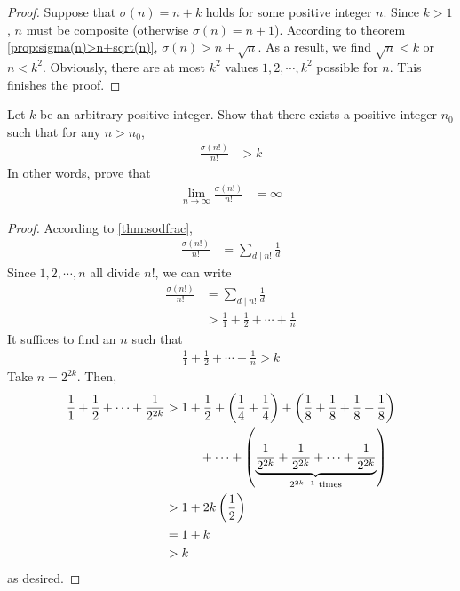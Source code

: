 \begin{proof}
	Suppose that $\sigma(n)=n+k$ holds for some positive integer $n$. Since $k>1$, $n$ must be composite (otherwise $\sigma(n)=n+1$). According to theorem \ref{prop:sigma(n)>n+sqrt(n)}, $\sigma(n) > n + \sqrt n$. As a result, we find $\sqrt n < k$ or $n < k^2$. Obviously, there are at most $k^2$ values $1,2,\cdots,k^2$ possible for $n$. This finishes the proof.
\end{proof}

\begin{theorem}
	Let $k$ be an arbitrary positive integer. Show that there exists a positive integer $n_0$ such that for any $n>n_0$,
		\begin{align*}
			\frac{\sigma(n!)}{n!}
				& > k
		\end{align*}
	In other words, prove that
		\begin{align*}
			\lim\limits_{n \to \infty} \frac{\sigma(n!)}{n!}
				& = \infty
		\end{align*}
\end{theorem}

\begin{proof}
	According to \autoref{thm:sodfrac},
		\begin{align*}
			\frac{\sigma(n!)}{n!} &= \sum_{d\mid n!} \frac{1}{d}
		\end{align*}
	Since $1,2,\cdots,n$ all divide $n!$, we can write
		\begin{align*}
			\frac{\sigma(n!)}{n!} &= \sum_{d\mid n!} \frac{1}{d}\\
						  &> \frac{1}{1} + \frac{1}{2}+ \cdots + \frac{1}{n}
		\end{align*}
	It suffices to find an $n$ such that
		\begin{align*}
			\frac{1}{1} + \frac{1}{2}+ \cdots + \frac{1}{n} > k
		\end{align*}
	Take $n=2^{2k}$. Then,
		\begin{align*}
			\frac{1}{1} + \frac{1}{2}+ \cdots + \frac{1}{2^{2k}}
				&> 1 + \frac{1}{2} + \left(\frac{1}{4} + \frac{1}{4}\right) +\left(\frac{1}{8} + \frac{1}{8}+\frac{1}{8} + \frac{1}{8}\right)\\
				&\phantom{>} \qquad  + \cdots +\left(\underbrace{\frac{1}{2^{2k}}+\frac{1}{2^{2k}}+\cdots+\frac{1}{2^{2k}}}_{2^{2k-1} \text{ times}}\right)\\
				&> 1+2k\left(\frac{1}{2}\right)\\
				&= 1+k\\
				&> k
		\end{align*}
	as desired.
\end{proof}

